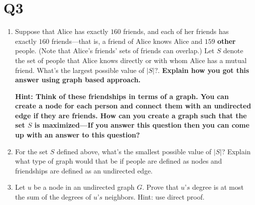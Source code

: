 \documentclass[12pt]{exam}
\begin{document}
\section{Q3}
\begin{enumerate}
    \item Suppose that Alice has exactly $160$ friends, and each of her friends has exactly $160$ friends---that is, a friend of Alice knows Alice and $159$ \textbf{other} people. (Note that Alice’s friends’ sets of friends can overlap.) Let $S$ denote the set of people that Alice knows directly or with whom Alice has a mutual friend. What’s the largest possible value of $|S|?$. \textbf{Explain how you got this answer using graph based approach.}
    
    \textbf{Hint: Think of these friendships in terms of a graph. You can create a node for each person and connect them with an undirected edge if they are friends. How can you create a graph such that the set $S$ is maximized---If you answer this question then you can come up with an answer to this question?}
    \item For the set $S$ defined above, what’s the smallest possible value of $|S|$? Explain what type of graph would that be if people are defined as nodes and friendships are defined as an undirected edge.
    \item Let $u$ be a node in an undirected graph $G$. Prove that $u’s$ degree is at most the sum of the degrees of $u’s$ neighbors. Hint: use direct proof.
\end{enumerate}
\end{document}
